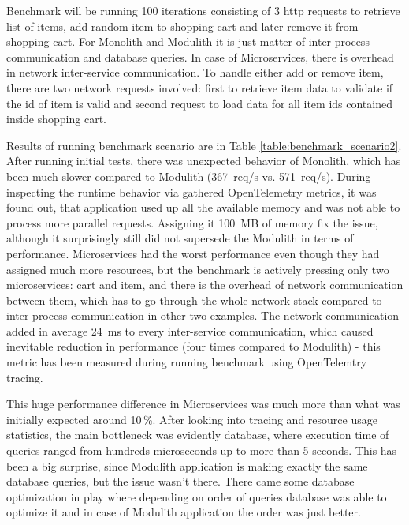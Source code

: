 Benchmark will be running 100 iterations consisting of 3 http requests to retrieve list of items, add random item to shopping cart and later remove it from shopping cart. For Monolith and Modulith it is just matter of inter-process communication and database queries. In case of Microservices, there is overhead in network inter-service communication. To handle either add or remove item, there are two network requests involved: first to retrieve item data to validate if the id of item is valid and second request to load data for all item ids contained inside shopping cart.

Results of running benchmark scenario are in Table \ref{table:benchmark_scenario2}. After running initial tests, there was unexpected behavior of Monolith, which has been much slower compared to Modulith (367~req/s vs. 571~req/s). During inspecting the runtime behavior via gathered OpenTelemetry metrics, it was found out, that application used up all the available memory and was not able to process more parallel requests. Assigning it 100~MB of memory fix the issue, although it surprisingly still did not supersede the Modulith in terms of performance. Microservices had the worst performance even though they had assigned much more resources, but the benchmark is actively pressing only two microservices: cart and item, and there is the overhead of network communication between them, which has to go through the whole network stack compared to inter-process communication in other two examples. The network communication added in average 24~ms to every inter-service communication, which caused inevitable reduction in performance (four times compared to Modulith) - this metric has been measured during running benchmark using OpenTelemtry tracing.

This huge performance difference in Microservices was much more than what was initially expected around 10\,\%. After looking into tracing and resource usage statistics, the main bottleneck was evidently database, where execution time of queries ranged from hundreds microseconds up to more than 5 seconds. This has been a big surprise, since Modulith application is making exactly the same database queries, but the issue wasn't there. There came some database optimization in play where depending on order of queries database was able to optimize it and in case of Modulith application the order was just better.

\label{p:latency_issue}

